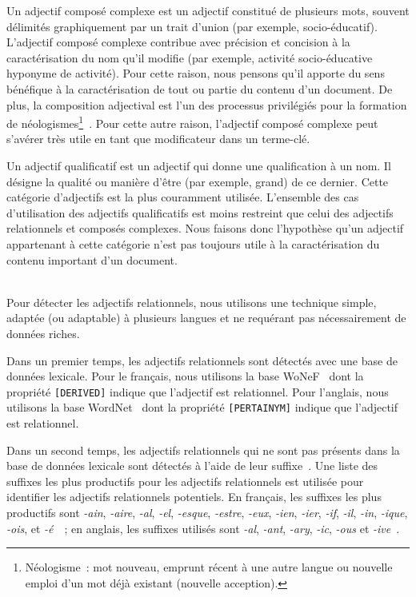       Un adjectif composé complexe est un adjectif constitué de plusieurs mots,
      souvent délimités graphiquement par un trait d'union (par exemple,
      \og{}socio-éducatif\fg{}). L'adjectif composé complexe contribue avec
      précision et concision à la caractérisation du nom qu'il modifie (par
      exemple, \og{}activité socio-éducative\fg{} hyponyme de
      \og{}activité\fg{}). Pour cette raison, nous pensons qu'il apporte du sens
      bénéfique à la caractérisation de tout ou partie du contenu d'un document.
      De plus, la composition adjectival est l'un des processus privilégiés pour
      la formation de néologismes\footnote{Néologisme~: mot nouveau, emprunt
      récent à une autre langue ou nouvelle emploi d'un mot déjà existant
      (nouvelle acception).}~\cite{boughedaoui1997adjectifscomposes}. Pour cette
      autre raison, l'adjectif composé complexe peut s'avérer très utile en tant
      que modificateur dans un terme-clé.

      Un adjectif qualificatif est un adjectif qui donne une qualification à un
      nom. Il désigne la qualité ou manière d'être (par exemple,
      \og{}grand\fg{}) de ce dernier. Cette catégorie d'adjectifs est la
      plus couramment utilisée. L'ensemble des cas d'utilisation des adjectifs
      qualificatifs est moins restreint que celui des adjectifs relationnels et
      composés complexes. Nous faisons donc l'hypothèse qu'un adjectif
      appartenant à cette catégorie n'est pas toujours utile à la
      caractérisation du contenu important d'un document.
      
      ~\\Pour détecter les adjectifs relationnels, nous utilisons une technique
      simple, adaptée (ou adaptable) à plusieurs langues et ne requérant pas
      nécessairement de données riches.

      Dans un premier temps, les adjectifs relationnels sont détectés avec une
      base de données lexicale. Pour le français, nous utilisons la base
      WoNeF~\cite{pradet2013wonef} dont la propriété \texttt{[DERIVED]}
      indique que l'adjectif est relationnel. Pour l'anglais, nous
      utilisons la base  WordNet~\cite{miller1995wordnet} dont la propriété
      \texttt{[PERTAINYM]} indique que l'adjectif est relationnel.

      Dans un second temps, les adjectifs relationnels qui ne sont pas présents
      dans la base de données lexicale sont détectés à l'aide de leur
      suffixe~\cite{dubois1999derivation}. Une liste des suffixes les plus
      productifs pour les adjectifs relationnels est utilisée pour identifier
      les adjectifs relationnels potentiels. En français, les suffixes les plus
      productifs sont \textit{-ain}, \textit{-aire}, \textit{-al}, \textit{-el},
      \textit{-esque}, \textit{-estre}, \textit{-eux}, \textit{-ien},
      \textit{-ier}, \textit{-if}, \textit{-il}, \textit{-in}, \textit{-ique},
      \textit{-ois}, et
      \textit{-é}~\cite{harastani2013relationaladjectivetranslation}~; en
      anglais, les suffixes utilisés sont \textit{-al}, \textit{-ant},
      \textit{-ary}, \textit{-ic}, \textit{-ous} et
      \textit{-ive}~\cite{grabar2006terminologystructuring}.

